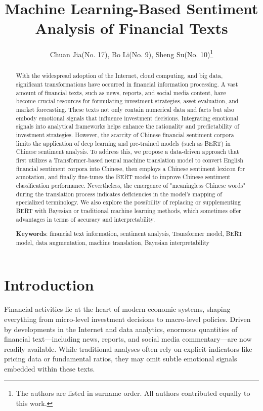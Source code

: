 \documentclass[12pt]{article}
\title{Machine Learning-Based Sentiment Analysis
of Financial Texts}
\author[1]{Chuan Jia(No. 17), Bo Li(No. 9), Sheng Su(No. 10)\footnote{The authors are listed in surname order. All authors contributed equally to this work.}}
\date{}  %
\begin{document}
\maketitle

\begin{abstract}
With the widespread adoption of the Internet, cloud computing, and big data, significant transformations have occurred in financial information processing. A vast amount of financial texts, such as news, reports, and social media content, have become crucial resources for formulating investment strategies, asset evaluation, and market forecasting. These texts not only contain numerical data and facts but also embody emotional signals that influence investment decisions. Integrating emotional signals into analytical frameworks helps enhance the rationality and predictability of investment strategies. However, the scarcity of Chinese financial sentiment corpora limits the application of deep learning and pre-trained models (such as BERT) in Chinese sentiment analysis. To address this, we propose a data-driven approach that first utilizes a Transformer-based neural machine translation model to convert English financial sentiment corpora into Chinese, then employs a Chinese sentiment lexicon for annotation, and finally fine-tunes the BERT model to improve Chinese sentiment classification performance. Nevertheless, the emergence of "meaningless Chinese words" during the translation process indicates deficiencies in the model's mapping of specialized terminology. We also explore the possibility of replacing or supplementing BERT with Bayesian or traditional machine learning methods, which sometimes offer advantages in terms of accuracy and interpretability.

\textbf{Keywords}: financial text information, sentiment analysis, Transformer model, BERT model, data augmentation, machine translation, Bayesian interpretability
\end{abstract}


\section{Introduction}
\label{sec:intro}

Financial activities lie at the heart of modern economic systems, shaping everything from micro-level investment decisions to macro-level policies. Driven by developments in the Internet and data analytics, enormous quantities of financial text---including news, reports, and social media commentary---are now readily available. While traditional analyses often rely on explicit indicators like pricing data or fundamental ratios, they may omit subtle emotional signals embedded within these texts.
\end{document}
